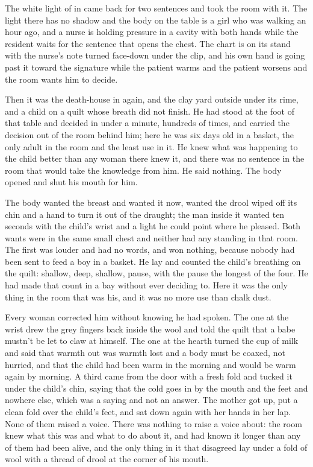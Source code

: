 The white light of  in  came back for two sentences and took the room with it. The light there has no shadow and the body on the table is a girl who was walking an hour ago, and a nurse is holding pressure in a cavity with both hands while the resident waits for the sentence that opens the chest. The chart is on its stand with the nurse's note turned face-down under the clip, and his own hand is going past it toward the signature while the patient warms and the patient worsens and the room wants him to decide.

Then it was the death-house in  again, and the clay yard outside under its rime, and a child on a quilt whose breath did not finish. He had stood at the foot of that table and decided in under a minute, hundreds of times, and carried the decision out of the room behind him; here he was six days old in a basket, the only adult in the room and the least use in it. He knew what was happening to the child better than any woman there knew it, and there was no sentence in the room that would take the knowledge from him. He said nothing. The body opened and shut his mouth for him.

The body wanted the breast and wanted it now, wanted the drool wiped off its chin and a hand to turn it out of the draught; the man inside it wanted ten seconds with the child's wrist and a light he could point where he pleased. Both wants were in the same small chest and neither had any standing in that room. The first was louder and had no words, and won nothing, because nobody had been sent to feed a boy in a basket. He lay and counted the child's breathing on the quilt: shallow, deep, shallow, pause, with the pause the longest of the four. He had made that count in a bay without ever deciding to. Here it was the only thing in the room that was his, and it was no more use than chalk dust.

Every woman corrected him without knowing he had spoken. The one at the wrist drew the grey fingers back inside the wool and told the quilt that a babe mustn't be let to claw at himself. The one at the hearth turned the cup of milk and said that warmth out was warmth lost and a body must be coaxed, not hurried, and that the child had been warm in the morning and would be warm again by morning. A third came from the door with a fresh fold and tucked it under the child's chin, saying that the cold goes in by the mouth and the feet and nowhere else, which was a saying and not an answer. The mother got up, put a clean fold over the child's feet, and sat down again with her hands in her lap. None of them raised a voice. There was nothing to raise a voice about: the room knew what this was and what to do about it, and had known it longer than any of them had been alive, and the only thing in it that disagreed lay under a fold of wool with a thread of drool at the corner of his mouth.

